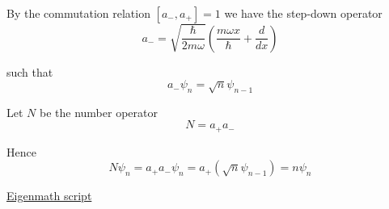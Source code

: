By the commutation relation $[a_-,a_+]=1$ we have the step-down operator
\begin{equation*}
a_-=\sqrt{\frac{\hbar}{2m\omega}}
\left(\frac{m\omega x}{\hbar}+\frac{d}{dx}\right)
\end{equation*}

such that
\begin{equation*}
a_-\psi_n=\sqrt{n}\psi_{n-1}
\end{equation*}

Let $N$ be the number operator
\begin{equation*}
N=a_+a_-
\end{equation*}

Hence
\begin{equation*}
N\psi_n=a_+a_-\psi_n=a_+\left(\sqrt n\psi_{n-1}\right)=n\psi_n
\end{equation*}

\href{https://georgeweigt.github.io/examples/harmonic-oscillator-2-demo.html}{Eigenmath script}


